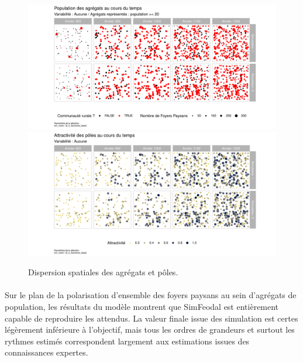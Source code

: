 
\begin{figure}[H]
	\centering
	\includegraphics[width=\linewidth]{img/results_6_6/Agregats_Carte_Haut.pdf}
	\includegraphics[width=\linewidth]{img/results_6_6/Poles_Carte_Haut.pdf}
	\caption{Dispersion spatiales des agrégats et pôles.}
	\label{fig:results-carte-agregats_poles}
\end{figure}

\bigskip
\paragraph[Conclusion intermédiaire]{}
Sur le plan de la polarisation d'ensemble des foyers paysans au sein d'agrégats de population, les résultats du modèle montrent que SimFeodal est entièrement capable de reproduire les attendus.
La valeur finale issue des simulation est certes légèrement inférieure à l'objectif, mais tous les ordres de grandeurs et surtout les rythmes estimés correspondent largement aux estimations issues des connaissances expertes.


